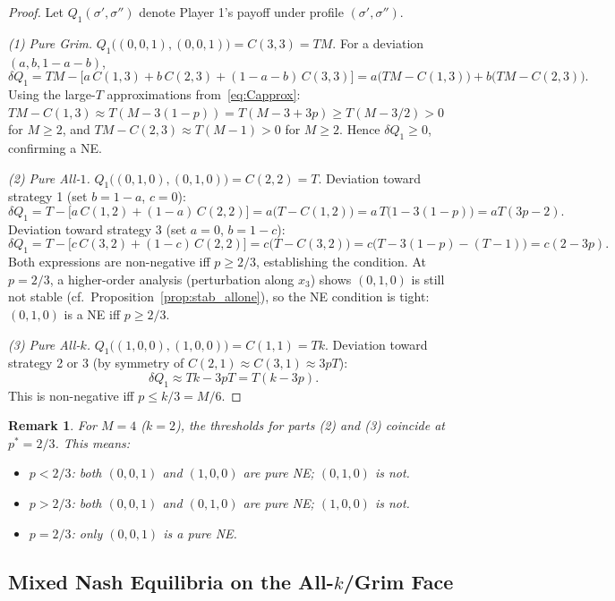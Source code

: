 \documentclass[12pt,a4paper]{article}
\newtheorem{remark}{Remark}[section]
\begin{document}
\begin{proof}
Let $Q_1(\sigma',\sigma'')$ denote Player 1's payoff under profile $(\sigma',\sigma'')$.

\medskip
\noindent\textit{(1) Pure Grim.}
$Q_1\bigl((0,0,1),(0,0,1)\bigr)=C(3,3)=TM$.
For a deviation $(a,b,1-a-b)$,
\[
  \delta Q_1 = TM - \bigl[a\,C(1,3)+b\,C(2,3)+(1-a-b)\,C(3,3)\bigr]
  = a\bigl(TM-C(1,3)\bigr)+b\bigl(TM-C(2,3)\bigr).
\]
Using the large-$T$ approximations from~\eqref{eq:Capprox}:
$TM - C(1,3)\approx T(M-3(1-p)) = T(M-3+3p)\geq T(M-3/2)>0$ for $M\geq 2$,
and $TM - C(2,3)\approx T(M-1)>0$ for $M\geq 2$.
Hence $\delta Q_1\geq 0$, confirming a NE.

\medskip
\noindent\textit{(2) Pure All-$1$.}
$Q_1\bigl((0,1,0),(0,1,0)\bigr)=C(2,2)=T$.
Deviation toward strategy 1 (set $b=1-a$, $c=0$):
\[
  \delta Q_1 = T - \bigl[a\,C(1,2)+(1-a)\,C(2,2)\bigr]
  = a\bigl(T - C(1,2)\bigr) = a\,T\bigl(1-3(1-p)\bigr) = aT(3p-2).
\]
Deviation toward strategy 3 (set $a=0$, $b=1-c$):
\[
  \delta Q_1 = T - \bigl[c\,C(3,2)+(1-c)\,C(2,2)\bigr]
  = c\bigl(T - C(3,2)\bigr) = c\bigl(T - 3(1-p) - (T-1)\bigr) = c(2-3p).
\]
Both expressions are non-negative iff $p\geq 2/3$, establishing the condition.
At $p=2/3$, a higher-order analysis (perturbation along $x_3$) shows
$(0,1,0)$ is still not stable (cf.\ Proposition~\ref{prop:stab_allone}), so
the NE condition is tight: $(0,1,0)$ is a NE iff $p\geq 2/3$.

\medskip
\noindent\textit{(3) Pure All-$k$.}
$Q_1\bigl((1,0,0),(1,0,0)\bigr)=C(1,1)=Tk$.
Deviation toward strategy 2 or 3 (by symmetry of $C(2,1)\approx C(3,1)\approx 3pT$):
\[
  \delta Q_1 \approx Tk - 3pT = T(k-3p).
\]
This is non-negative iff $p\leq k/3 = M/6$.
\end{proof}

\begin{remark}
For $M=4$ ($k=2$), the thresholds for parts (2) and (3) coincide at $p^*=2/3$.
This means:
\begin{itemize}
  \item $p<2/3$: both $(0,0,1)$ and $(1,0,0)$ are pure NE; $(0,1,0)$ is not.
  \item $p>2/3$: both $(0,0,1)$ and $(0,1,0)$ are pure NE; $(1,0,0)$ is not.
  \item $p=2/3$: only $(0,0,1)$ is a pure NE.
\end{itemize}
\end{remark}

\subsection{Mixed Nash Equilibria on the All-\texorpdfstring{$k$}{k}/Grim Face}
\end{document}
